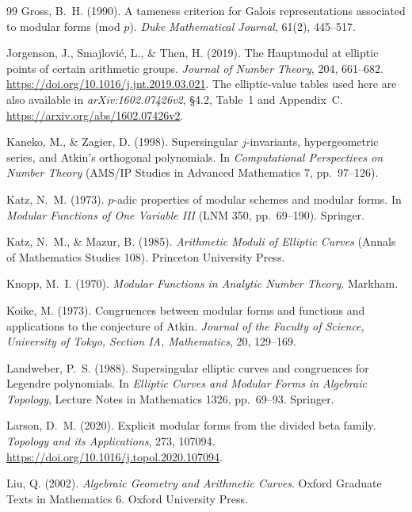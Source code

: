 \documentclass[11pt,a4paper]{article}
\numberwithin{equation}{section}
\theoremstyle{definition}
\theoremstyle{remark}
\begin{document}
\begin{thebibliography}{99}
 Gross, B.~H. (1990). A tameness criterion for Galois representations associated to modular forms (mod $p$). \emph{Duke Mathematical Journal}, 61(2), 445--517.

 Jorgenson, J., Smajlovi\'c, L., \& Then, H. (2019).
The Hauptmodul at elliptic points of certain arithmetic groups.
\emph{Journal of Number Theory}, 204, 661--682.
\url{https://doi.org/10.1016/j.jnt.2019.03.021}.
The elliptic-value tables used here are also available in
\emph{arXiv:1602.07426v2}, \S4.2, Table~1 and Appendix~C.
\url{https://arxiv.org/abs/1602.07426v2}.

 Kaneko, M., \& Zagier, D. (1998). Supersingular $j$-invariants,
hypergeometric series, and Atkin's orthogonal polynomials. In \emph{Computational Perspectives on Number
Theory} (AMS/IP Studies in Advanced Mathematics 7, pp.~97--126).

 Katz, N.~M. (1973). $p$-adic properties of modular schemes and modular forms.
In \emph{Modular Functions of One Variable III} (LNM 350, pp.~69--190). Springer.

 Katz, N.~M., \& Mazur, B. (1985). \emph{Arithmetic Moduli of Elliptic
Curves} (Annals of Mathematics Studies 108). Princeton University Press.

 Knopp, M.~I. (1970). \emph{Modular Functions in Analytic Number Theory}. Markham.

 Koike, M. (1973). Congruences between modular forms
and functions and applications to the conjecture of Atkin.
\emph{Journal of the Faculty of Science, University of Tokyo, Section IA, Mathematics},
20, 129--169.

 Landweber, P.~S. (1988). Supersingular elliptic curves and congruences for Legendre polynomials. In \emph{Elliptic Curves and Modular Forms in Algebraic Topology}, Lecture Notes in Mathematics 1326, pp.~69--93. Springer.

 Larson, D.~M. (2020). Explicit modular forms from the divided beta family. \emph{Topology and its Applications}, 273, 107094. \url{https://doi.org/10.1016/j.topol.2020.107094}.

 Liu, Q. (2002). \emph{Algebraic Geometry and Arithmetic Curves}. Oxford Graduate Texts in Mathematics 6. Oxford University Press.


\end{thebibliography}
\end{document}
